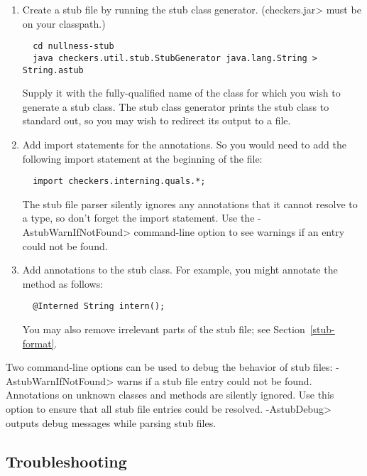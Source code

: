 \begin{enumerate}

\item
  Create a stub file by running the stub class generator.  (\<checkers.jar>
  must be on your classpath.)

\begin{Verbatim}
  cd nullness-stub
  java checkers.util.stub.StubGenerator java.lang.String > String.astub
\end{Verbatim}

  Supply it with the fully-qualified name of the class for which you wish to
  generate a stub class.  The stub class generator prints the
  stub class to standard out, so you may wish to redirect its output to a
  file.

\item
  Add import statements for the annotations.  So you would need to
add the following import statement at the beginning of the file:

\begin{Verbatim}
  import checkers.interning.quals.*;
\end{Verbatim}

\noindent
The stub file parser silently ignores any annotations that it cannot
resolve to a type, so don't forget the import statement.
Use the \<-AstubWarnIfNotFound> command-line option to see warnings
if an entry could not be found.

\item
  Add annotations to the stub class.  For example, you might annotate
  the  method as follows:

\begin{Verbatim}
  @Interned String intern();
\end{Verbatim}

  You may also remove irrelevant parts of the stub file; see
  Section~\ref{stub-format}.

\end{enumerate}


Two command-line options can be used to debug the behavior of stub
files:
\<-AstubWarnIfNotFound> warns if a stub file entry could not be
found. Annotations on unknown classes and methods are silently
ignored. Use this option to ensure that all stub file entries could be
resolved.
\<-AstubDebug> outputs debug messages while parsing stub files.


\subsection{Troubleshooting\label{stub-troubleshooting}}

